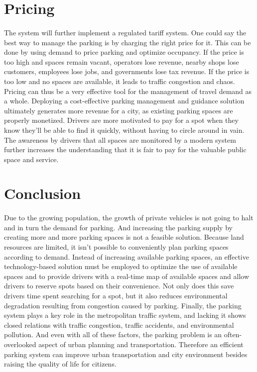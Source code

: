     \section{Pricing}
    \paragraph*{}
    The system will further implement a regulated tariff system. One could say the best way to manage the parking is by charging the right price for it. This can be done by using demand to price parking and optimize occupancy. If the price is too high and spaces remain vacant, operators lose revenue, nearby shops lose customers, employees lose jobs, and governments lose tax revenue. If the price is too low and no spaces are available, it leads to traffic congestion and chaos. Pricing can thus be a very effective tool for the management of travel demand as a whole. Deploying a cost-effective parking management and guidance solution ultimately generates more revenue for a city, as existing parking spaces are properly monetized. Drivers are more motivated to pay for a spot when they know they’ll be able to find it quickly, without having to circle around in vain. The awareness by drivers that all spaces are monitored by a modern system further increases the understanding that it is fair to pay for the valuable public space and service. 

\section{Conclusion}
\paragraph*{}
    Due to the growing population, the growth of private vehicles is not going to halt and in turn the demand for parking. And increasing the parking supply by creating more and more parking spaces is not a feasible solution. Because land resources are limited, it isn’t possible to conveniently plan parking spaces according to demand. Instead of increasing available parking spaces, an effective technology-based solution must be employed to optimize the use of available spaces and to  provide drivers with a real-time map of available spaces and allow drivers to reserve spots based on their convenience. Not only does this save drivers time spent searching for a spot, but it also reduces environmental degradation resulting from congestion caused by parking. Finally, the parking system plays a key role in the metropolitan traffic system, and lacking it shows closed relations with traffic congestion, traffic accidents, and environmental pollution. And even with all of these factors, the parking problem is an often-overlooked aspect of urban planning and transportation. Therefore an efficient parking system can improve urban transportation and city environment besides raising the quality of life for citizens.
